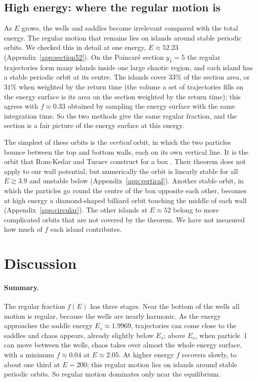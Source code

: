\documentclass[11pt,a4paper]{article}
\begin{document}
\subsection{High energy: where the regular motion is}\label{sec:high}
As $E$ grows, the wells and saddles become irrelevant compared with the total
energy. The regular motion that remains lies on islands around stable periodic
orbits. We checked this in detail at one energy, $E\approx52.23$
(Appendix~\ref{app:section52}). On the Poincar\'e section $y_1=5$ the regular
trajectories form many islands inside one large chaotic region, and each
island has a stable periodic orbit at its centre. The islands cover $33\%$ of
the section area, or $31\%$ when weighted by the return time (the volume a
set of trajectories fills on the energy surface is its area on the section
weighted by the return time); this agrees with
$f\approx0.33$ obtained by sampling the energy surface with the same
integration time. So the two methods give the same regular fraction, and the
section is a fair picture of the energy surface at this energy.

The simplest of these orbits is the \emph{vertical} orbit, in which the two
particles bounce between the top and bottom walls, each on its own vertical
line. It is the orbit that Rom-Kedar and Turaev construct for a box
\cite[Sec.~2.6]{turaev2022}. Their theorem does not apply to our wall
potential, but numerically the orbit is linearly stable for all
$E\gtrsim3.9$ and unstable below (Appendix~\ref{app:vertical}). Another
stable orbit, in which the particles go round the centre of the box opposite
each other, becomes at high energy a diamond-shaped billiard orbit touching
the middle of each wall (Appendix~\ref{app:circular}). The other islands at
$E\approx52$ belong to more complicated orbits that are not covered by the
theorem. We have not measured how much of $f$ each island contributes.

\section{Discussion}\label{sec:discussion}

\paragraph{Summary.}
The regular fraction $f(E)$ has three stages. Near the bottom of the wells all
motion is regular, because the wells are nearly harmonic. As the energy
approaches the saddle energy $E_s\approx1.9969$, trajectories can come close to
the saddles and chaos appears, already slightly below $E_s$; above $E_s$, when
particle~1 can move between the wells, chaos takes over almost the whole
energy surface, with a minimum $f\approx0.04$ at $E\approx2.05$. At higher
energy $f$ recovers slowly, to about one third at $E=200$; this regular motion
lies on islands around stable periodic orbits. So regular motion dominates
only near the equilibrium.
\end{document}
